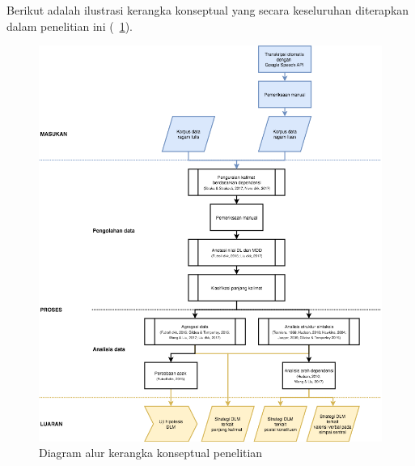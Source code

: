 Berikut adalah ilustrasi kerangka konseptual yang secara keseluruhan diterapkan dalam penelitian ini (\pic~\ref{fig:kerangka-konseptual}). 
\begin{figure}
	\centering \includegraphics[width=1
	\textwidth] {pics/kerangka-konseptual.png} \caption{Diagram alur kerangka konseptual penelitian} 
\label{fig:kerangka-konseptual} \end{figure}



